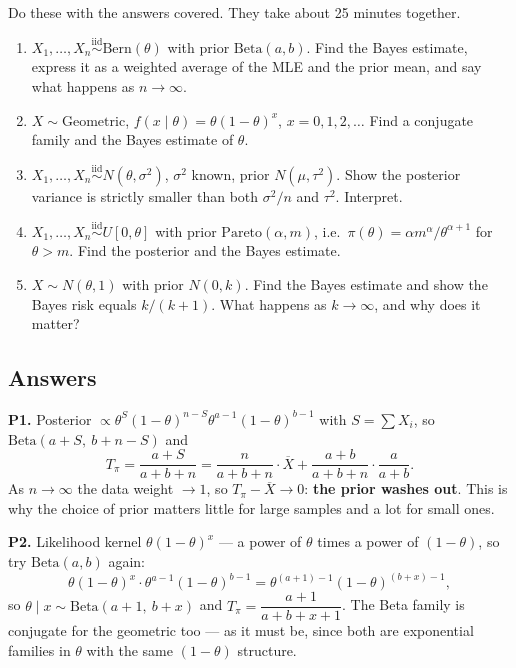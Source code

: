 \documentclass[11pt]{article}
\newcommand{\Xbar}{\overline{X}}
\newcommand{\iid}{\overset{\text{iid}}{\sim}}
\begin{document}
Do these with the answers covered. They take about 25 minutes together.

\begin{enumerate}[label=\textbf{P\arabic*.}]
\item $X_1,\dots,X_n\iid\mathrm{Bern}(\theta)$ with prior $\mathrm{Beta}(a,b)$. Find the Bayes
estimate, express it as a weighted average of the MLE and the prior mean, and say what happens
as $n\to\infty$.

\item $X\sim\mathrm{Geometric}$, $f(x\mid\theta)=\theta(1-\theta)^{x}$, $x=0,1,2,\dots$
Find a conjugate family and the Bayes estimate of $\theta$.

\item $X_1,\dots,X_n\iid N(\theta,\sigma^2)$, $\sigma^2$ known, prior $N(\mu,\tau^2)$. Show
the posterior variance is strictly smaller than both $\sigma^2/n$ and $\tau^2$. Interpret.

\item $X_1,\dots,X_n\iid U[0,\theta]$ with prior $\mathrm{Pareto}(\alpha,m)$, i.e.\
$\pi(\theta)=\alpha m^{\alpha}/\theta^{\alpha+1}$ for $\theta>m$. Find the posterior and the
Bayes estimate.

\item $X\sim N(\theta,1)$ with prior $N(0,k)$. Find the Bayes estimate and show the Bayes
risk equals $k/(k+1)$. What happens as $k\to\infty$, and why does it matter?
\end{enumerate}

\subsection*{Answers}

\noindent\textbf{P1.} Posterior $\propto\theta^{S}(1-\theta)^{n-S}\theta^{a-1}(1-\theta)^{b-1}$
with $S=\sum X_i$, so $\mathrm{Beta}(a+S,\ b+n-S)$ and
\[
T_\pi=\frac{a+S}{a+b+n}
=\frac{n}{a+b+n}\cdot\Xbar+\frac{a+b}{a+b+n}\cdot\frac{a}{a+b}.
\]
As $n\to\infty$ the data weight $\to1$, so $T_\pi-\Xbar\to0$: \textbf{the prior washes out}.
This is why the choice of prior matters little for large samples and a lot for small ones.

\smallskip
\noindent\textbf{P2.} Likelihood kernel $\theta(1-\theta)^{x}$ --- a power of $\theta$ times a
power of $(1-\theta)$, so try $\mathrm{Beta}(a,b)$ again:
\[
\theta(1-\theta)^{x}\cdot\theta^{a-1}(1-\theta)^{b-1}=\theta^{(a+1)-1}(1-\theta)^{(b+x)-1},
\]
so $\theta\mid x\sim\mathrm{Beta}(a+1,\ b+x)$ and
$T_\pi=\dfrac{a+1}{a+b+x+1}$. The Beta family is conjugate for the geometric too --- as it
must be, since both are exponential families in $\theta$ with the same $(1-\theta)$ structure.
\end{document}
